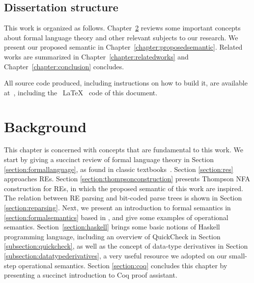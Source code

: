\documentclass[oneside,12pt]{scrbook}
\theoremstyle{definition}
\theoremstyle{plain}
\theoremstyle{definition}
\begin{document}
\section{Dissertation structure}\label{section:structure}

This work is organized as follows. Chapter~\ref{chapter:background} reviews some important concepts about
formal language theory and other relevant subjects to our research. We present our proposed semantic in Chapter~\ref{chapter:proposedsemantic}. Related works are summarized in Chapter~\ref{chapter:relatedworks} and Chapter~\ref{chapter:conclusion} concludes.

All source code produced, including instructions on how to build it, are available at~\cite{regexvm-rep}, including the ~\LaTeX~ code of this document.





\chapter{Background}\label{chapter:background}

This chapter is concerned with concepts that are fundamental to this work. We start by giving a succinct
review of formal language theory in Section \ref{section:formallanguage}, as found in classic textbooks~\cite{Hopcroft2000}. Section \ref{section:res} approaches REs.  Section \ref{section:thompsonconstruction} presents Thompson NFA construction for REs, in which the proposed semantic of this work are inspired. The relation between RE parsing and bit-coded parse trees is shown in Section \ref{section:reparsing}. Next, we present an introduction to
formal semantics in \ref{section:formalsemantics} based in \cite{Pierce2000}, and give some examples of operational
semantics. Section~\ref{section:haskell} brings some basic notions of Haskell programming language, including an overview of QuickCheck in Section \ref{subsection:quickcheck}, as well as the concept of data-type derivatives in Section \ref{subsection:datatypederivatives}, a very useful resource we adopted on our small-step operational semantics. Section \ref{section:coq} concludes this chapter by presenting a succinct introduction to Coq proof assistant.
\end{document}
